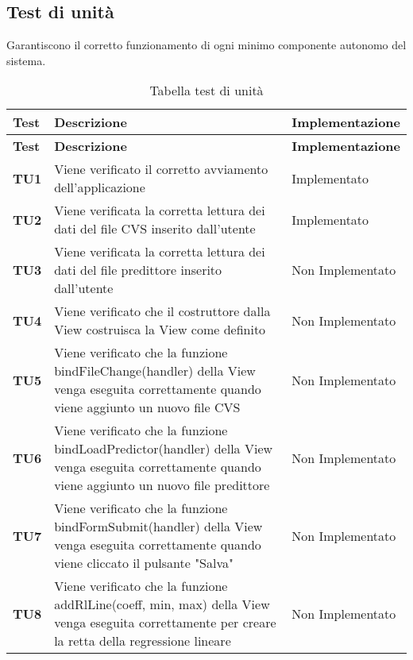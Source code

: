 \documentclass[../piano-di-qualifica.tex]{subfiles}
\begin{document}
\subsection{Test di unità}
\label{sub:test_di_unita}
Garantiscono il corretto funzionamento di ogni minimo componente autonomo del sistema.

\renewcommand{\arraystretch}{2} %
\begin{longtable}[H]{>{\centering\bfseries}m{2.5cm} >{\centering}m{7.5cm} >{\centering\arraybackslash}m{3.5cm}}
  \caption{Tabella test di unità}%
  \label{tab:tabella_test_di_unita}                                                    \\
  \rowcolor{lightgray}
  {\textbf{Test}} & {\textbf{Descrizione}} & {\textbf{Implementazione}}  \\
  \endfirsthead%
  \rowcolor{lightgray}
  {\textbf{Test}} & {\textbf{Descrizione}} & {\textbf{Implementazione}}  \\
  \endhead%
  \rowcolor{white}
  \multicolumn{3}{c}{\textit{Continua alla pagina successiva}}
  \endfoot%
  \endlastfoot%
  \textbf{TU1} & Viene verificato il corretto avviamento dell'applicazione & Implementato \\
  \textbf{TU2} & Viene verificata la corretta lettura dei dati del file CVS inserito dall'utente & Implementato \\
  \textbf{TU3} & Viene verificata la corretta lettura dei dati del file predittore inserito dall'utente & Non Implementato \\
  \textbf{TU4} & Viene verificato che il costruttore dalla View costruisca la View come definito & Non Implementato \\
  \textbf{TU5} & Viene verificato che la funzione bindFileChange(handler) della View venga eseguita correttamente quando viene aggiunto un nuovo file CVS & Non Implementato \\
  \textbf{TU6} & Viene verificato che la funzione bindLoadPredictor(handler) della View venga eseguita correttamente quando viene aggiunto un nuovo file predittore & Non Implementato \\
  \textbf{TU7} & Viene verificato che la funzione bindFormSubmit(handler) della View venga eseguita correttamente quando viene cliccato il pulsante "Salva" & Non Implementato \\
  \textbf{TU8} & Viene verificato che la funzione addRlLine(coeff, min, max) della View venga eseguita correttamente per creare la retta della regressione lineare & Non Implementato \\

\end{longtable}
\end{document}
